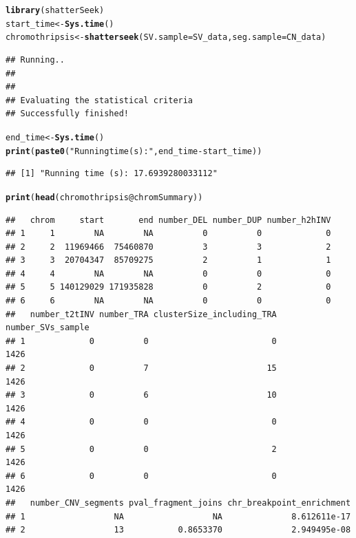\documentclass[twoside,a4wide,11pt]{article}\usepackage[]{graphicx}\usepackage[]{color}
\makeatletter
\newcommand{\hlstr}[1]{\textcolor[rgb]{0.192,0.494,0.8}{#1}}%
\newcommand{\hlopt}[1]{\textcolor[rgb]{0,0,0}{#1}}%
\newcommand{\hlstd}[1]{\textcolor[rgb]{0.345,0.345,0.345}{#1}}%
\newcommand{\hlkwb}[1]{\textcolor[rgb]{0.69,0.353,0.396}{#1}}%
\newcommand{\hlkwc}[1]{\textcolor[rgb]{0.333,0.667,0.333}{#1}}%
\newcommand{\hlkwd}[1]{\textcolor[rgb]{0.737,0.353,0.396}{\textbf{#1}}}%
\newenvironment{kframe}{%
 \def\at@end@of@kframe{}%
 \ifinner\ifhmode%
  \def\at@end@of@kframe{\end{minipage}}%
  \begin{minipage}{\columnwidth}%
 \fi\fi%
 \def\FrameCommand##1{\hskip\@totalleftmargin \hskip-\fboxsep
 \colorbox{shadecolor}{##1}\hskip-\fboxsep
     \hskip-\linewidth \hskip-\@totalleftmargin \hskip\columnwidth}%
 \MakeFramed {\advance\hsize-\width
   \@totalleftmargin\z@ \linewidth\hsize
   \@setminipage}}%
 {\par\unskip\endMakeFramed%
 \at@end@of@kframe}
\newenvironment{knitrout}{}{} %
\makeatother
\begin{document}
\begin{knitrout}
\color{fgcolor}\begin{kframe}
\begin{alltt}
\hlkwd{library}\hlstd{(shatterSeek)}
\hlstd{start_time} \hlkwb{<-} \hlkwd{Sys.time}\hlstd{()}
\hlstd{chromothripsis} \hlkwb{<-} \hlkwd{shatterseek}\hlstd{(}\hlkwc{SV.sample}\hlstd{=SV_data,} \hlkwc{seg.sample}\hlstd{=CN_data)}
\end{alltt}
\begin{verbatim}
## Running..
## 
## 
## Evaluating the statistical criteria
## Successfully finished!
\end{verbatim}
\begin{alltt}
\hlstd{end_time} \hlkwb{<-} \hlkwd{Sys.time}\hlstd{()}
\hlkwd{print}\hlstd{(}\hlkwd{paste0}\hlstd{(}\hlstr{"Running time (s): "}\hlstd{,end_time} \hlopt{-} \hlstd{start_time))}
\end{alltt}
\begin{verbatim}
## [1] "Running time (s): 17.6939280033112"
\end{verbatim}
\begin{alltt}
\hlkwd{print}\hlstd{(}\hlkwd{head}\hlstd{(chromothripsis}\hlopt{@}\hlkwc{chromSummary}\hlstd{))}
\end{alltt}
\begin{verbatim}
##   chrom     start       end number_DEL number_DUP number_h2hINV
## 1     1        NA        NA          0          0             0
## 2     2  11969466  75460870          3          3             2
## 3     3  20704347  85709275          2          1             1
## 4     4        NA        NA          0          0             0
## 5     5 140129029 171935828          0          2             0
## 6     6        NA        NA          0          0             0
##   number_t2tINV number_TRA clusterSize_including_TRA number_SVs_sample
## 1             0          0                         0              1426
## 2             0          7                        15              1426
## 3             0          6                        10              1426
## 4             0          0                         0              1426
## 5             0          0                         2              1426
## 6             0          0                         0              1426
##   number_CNV_segments pval_fragment_joins chr_breakpoint_enrichment
## 1                  NA                  NA              8.612611e-17
## 2                  13           0.8653370              2.949495e-08

\end{verbatim}
\end{kframe}
\end{knitrout}
\end{document}
